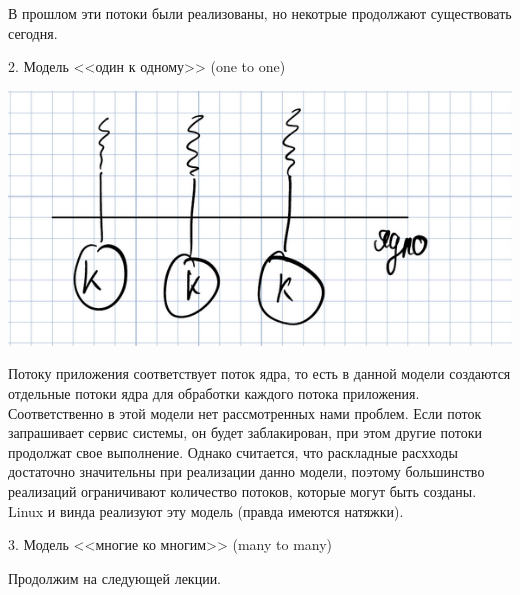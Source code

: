\documentclass[a4paper, 12pt]{report}
\begin{document}
	В прошлом эти потоки были реализованы, но некотрые продолжают существовать сегодня.
	
	2. Модель <<один к одному>> (one to one)
	
	\includegraphics[width=\linewidth]{8}
	
	Потоку приложения соответствует поток ядра, то есть в данной модели создаются отдельные потоки ядра для обработки каждого потока приложения. Соответственно в этой модели нет рассмотренных нами проблем. Если поток запрашивает сервис системы, он будет заблакирован, при этом другие потоки продолжат свое выполнение. Однако считается, что раскладные расхходы достаточно значительны при реализации данно модели, поэтому большинство реализаций ограничивают количество потоков, которые могут быть созданы. Linux и винда реализуют эту модель (правда имеются натяжки).
	
	3. Модель <<многие ко многим>> (many to many)
	
	Продолжим на следующей лекции.
\end{document}
